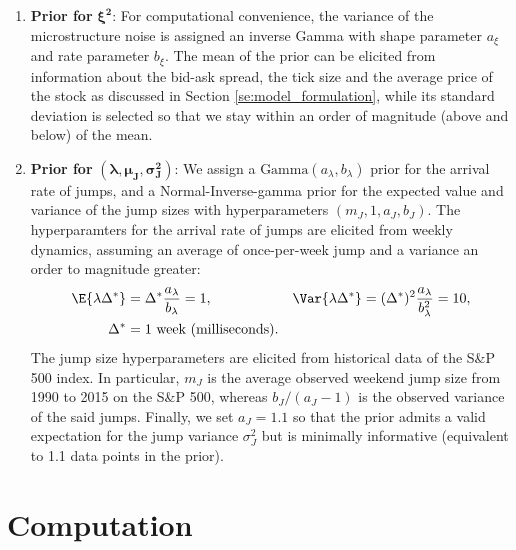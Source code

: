 \begin{enumerate}

\item{\textbf{Prior for} $\boldsymbol{\xi^2}$:}  For computational convenience, the variance of the microstructure noise is assigned an inverse Gamma with shape parameter $a_{\xi}$ and rate parameter $b_{\xi}$.  The mean of the prior can be elicited from information about the bid-ask spread, the tick size and the average price of the stock as discussed in Section \ref{se:model_formulation}, while its standard deviation is selected so that we stay within an order of magnitude (above and below) of the mean.


\item{\textbf{Prior for} $(\boldsymbol{\lambda}, \boldsymbol{\mu_J}, \boldsymbol{\sigma^2_J})$:} We assign a $\mbox{Gamma}(a_\lambda,b_\lambda)$ prior for the arrival rate of jumps, and a Normal-Inverse-gamma prior for the expected value and variance of the jump sizes with hyperparameters $(m_J, 1, a_J, b_J)$. The hyperparamters for the arrival rate of jumps are elicited from weekly dynamics, assuming an average of once-per-week jump and a variance an order to magnitude greater:
  \begin{align*}
    \E{\lambda \Delta^*} &= \Delta^* \frac{a_\lambda}{b_\lambda} = 1, & \Var{\lambda \Delta^*} &= (\Delta^*)^2 \frac{a_\lambda}{b_\lambda^2} = 10, \\
    \Delta^* &= 1 \mbox{ week (milliseconds).}
  \end{align*}
  The jump size hyperparameters are elicited from historical data of the S\&P 500 index. In particular, $m_J$ is the average observed weekend jump size from 1990 to 2015 on the S\&P 500, whereas $b_J/(a_J-1)$ is the observed  variance of the said jumps. Finally, we set $a_J = 1.1$ so that the prior admits a valid expectation for the jump variance $\sigma_J^2$ but is minimally informative (equivalent to 1.1 data points in the prior).

\end{enumerate}


\section{Computation}\label{se:computation}

